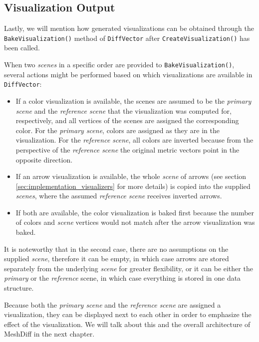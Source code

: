 \subsection{Visualization Output}
\label{sec:implementation-visualizers-output}

Lastly, we will mention how generated visualizations can be obtained through the \verb+BakeVisualization()+ method of \verb+DiffVector+ after \verb+CreateVisualization()+ has been called.

When two {\it scenes} in a specific order are provided to \verb+BakeVisualization()+, several actions might be performed based on which visualizations are available in \verb+DiffVector+:

\begin{itemize}
\item If a color visualization is available, the scenes are assumed to be the {\it primary scene} and the {\it reference scene} that the visualization was computed for, respectively, and all vertices of the scenes are assigned the corresponding color. For the {\it primary scene}, colors are assigned as they are in the visualization. For the {\it reference scene}, all colors are inverted because from the perspective of the {\it reference scene} the original metric vectors point in the opposite direction.
\item If an arrow visualization is available, the whole {\it scene} of arrows (see section \ref{sec:implementation_visualizers} for more details) is copied into the supplied {\it scenes}, where the assumed {\it reference scene} receives inverted arrows.
\item If both are available, the color visualization is baked first because the number of colors and {\it scene} vertices would not match after the arrow visualization was baked.
\end{itemize}

It is noteworthy that in the second case, there are no assumptions on the supplied {\it scene}, therefore it can be empty, in which case arrows are stored separately from the underlying {\it scene} for greater flexibility, or it can be either the {\it primary} or the {\it reference} scene, in which case everything is stored in one data structure.

Because both the {\it primary scene} and the {\it reference scene} are assigned a visualization, they can be displayed next to each other in order to emphasize the effect of the visualization. We will talk about this and the overall architecture of MeshDiff in the next chapter.
